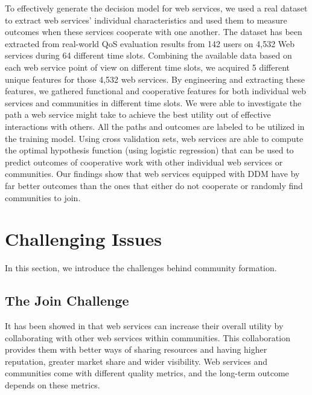 To effectively generate the decision model for web services, we used a real dataset to extract web services' individual characteristics and used them to measure outcomes when these services cooperate with one another. The dataset has been extracted from real-world QoS evaluation results from 142 users on 4,532 Web services during 64 different time slots. Combining the available data based on each web service point of view on different time slots, we acquired 5 different unique features for those 4,532 web services. By engineering and extracting these features, we gathered functional and cooperative features for both individual web services and communities in different time slots. We were able to investigate the path a web service might take to achieve the best utility out of effective interactions with others. All the paths and outcomes are labeled to be utilized in the training model. Using cross validation sets, web services are able to compute the optimal hypothesis function (using logistic regression) that can be used to predict outcomes of cooperative work with other individual web services or communities. Our findings show that web services equipped with DDM have by far better outcomes than the ones that either do not cooperate or randomly find communities to join.

\section{Challenging Issues}\label{s4:preliminaries}
In this section, we introduce the challenges behind community formation.

\subsection{The Join Challenge}\label{s:tjc}
It has been showed in \cite{10.1109/ARES.2008.7,10.1109/TSC.2012.12,journal-community-formation} that web services can increase their overall utility by collaborating with other web services within communities. This collaboration provides them with better ways of sharing resources and having higher reputation, greater market share and wider visibility. Web services and communities come with different quality metrics, and the long-term outcome depends on these metrics.

